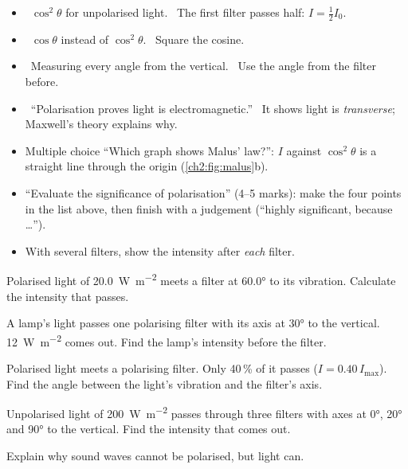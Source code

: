 \begin{mistakes}
\begin{itemize}
  \item \xmark\ $\cos^2\theta$ for unpolarised light. \cmark\ The first filter passes half:
        $I = \frac{1}{2}I_0$.
  \item \xmark\ $\cos\theta$ instead of $\cos^2\theta$. \cmark\ Square the cosine.
  \item \xmark\ Measuring every angle from the vertical. \cmark\ Use the angle from the
        filter before.
  \item \xmark\ ``Polarisation proves light is electromagnetic.'' \cmark\ It shows light is
        \emph{transverse}; Maxwell's theory explains why.
\end{itemize}
\end{mistakes}

\begin{examtip}
\begin{itemize}
  \item Multiple choice ``Which graph shows Malus' law?'': $I$ against $\cos^2\theta$ is a
        straight line through the origin (\cref{ch2:fig:malus}b).
  \item ``Evaluate the significance of polarisation'' (4--5 marks): make the four points
        in the list above, then finish with a judgement (``highly significant, because
        \ldots'').
  \item With several filters, show the intensity after \emph{each} filter.
\end{itemize}
\end{examtip}

\begin{quickcheck}
  \item Polarised light of \qty{20.0}{W.m^{-2}} meets a filter at \ang{60.0} to its
        vibration. Calculate the intensity that passes.
  \item A lamp's light passes one polarising filter with its axis at \ang{30} to the
        vertical. \qty{12}{W.m^{-2}} comes out. Find the lamp's intensity before the filter.
  \item Polarised light meets a polarising filter. Only 40\,\% of it passes
        ($I = 0.40\,I_\mathrm{max}$). Find the angle between the light's vibration and the
        filter's axis.
  \item Unpolarised light of \qty{200}{W.m^{-2}} passes through three filters with axes at
        \ang{0}, \ang{20} and \ang{90} to the vertical. Find the intensity that comes out.
  \item Explain why sound waves cannot be polarised, but light can.
\end{quickcheck}

